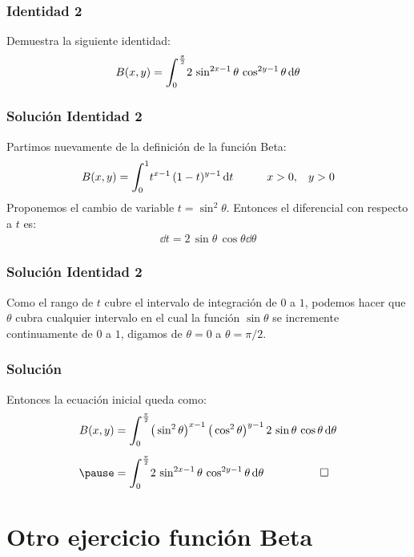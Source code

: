 \documentclass[12pt]{beamer}
\begin{document}
\begin{frame}
\frametitle{Identidad 2}
Demuestra la siguiente identidad:
\pause
\begin{align*}
B(x, y) = \scaleint{6ex}_{\bs 0}^{\frac{\pi}{2}} 2 \, \sin^{2x-1} \theta \, \cos^{2y-1} \theta \dd{\theta}
\end{align*} 
\end{frame}
\begin{frame}
\frametitle{Solución Identidad 2}
Partimos nuevamente de la definición de la función Beta:
\pause
\begin{align*}
B(x, y) = \scaleint{6ex}_{\bs 0}^{1} t^{x-1} \, (1 - t)^{y-1} \dd{t} \hspace{1cm} x > 0, \hspace{0.3cm} y > 0
\end{align*}
\pause
Proponemos el cambio de variable $t = \sin^{2} \theta$. \pause Entonces el diferencial con respecto a $t$ es:
\begin{align*}
\dd{t} = 2 \, \sin \theta \, \cos \theta \dd{\theta}
\end{align*}
\end{frame}
\begin{frame}
\frametitle{Solución Identidad 2}
Como el rango de $t$ cubre el intervalo de integración de $0$ a $1$, \pause podemos hacer que $\theta$ cubra cualquier intervalo en el cual la función $\sin \theta$ se incremente continuamente de $0$ a $1$, digamos de $\theta = 0$ a $\theta = \pi/2$.
\end{frame}
\begin{frame}
\frametitle{Solución}
Entonces la ecuación inicial queda como:
\pause 
\begin{eqnarray*}
\begin{aligned}
B(x, y) &= \scaleint{6ex}_{\bs 0}^{\frac{\pi}{2}} \big( \sin^{2} \theta \big)^{x-1} \, \big( \cos^{2} \theta \big)^{y-1} \, 2 \, \sin \theta \, \cos \theta \dd{\theta} \\[0.5em] \pause
&= \scaleint{6ex}_{\bs 0}^{\frac{\pi}{2}} 2 \, \sin^{2x -1} \theta \, \cos^{2y-1} \theta \dd{\theta} \hspace{1cm} \qed
\end{aligned}
\end{eqnarray*}
\end{frame}

\section{Otro ejercicio función Beta}
\end{document}
